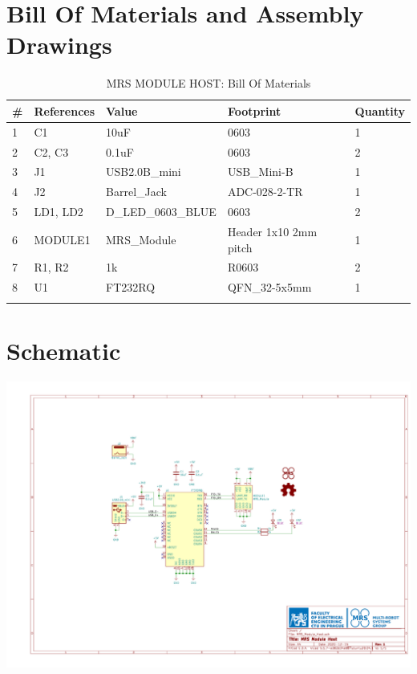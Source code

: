 \documentclass[12pt, a4paper]{article}
\begin{document}
\section{Bill Of Materials and Assembly Drawings}
\begin{longtable}{|p{0.5cm}|p{5cm}|p{5cm}|p{5cm}|p{1.7cm}|}
\hline
\textbf{\#} & \textbf{References}                                                          & \textbf{Value} & \textbf{Footprint} & \textbf{Quantity} 		\\ \hline
1 & C1       & 10uF               & 0603 & 1      				\\ \hline
2 & C2, C3   & 0.1uF              & 0603 & 2                	\\ \hline
3 & J1       & USB2.0B\_mini      & USB\_Mini-B   & 1       	\\ \hline
4 & J2       & Barrel\_Jack       & ADC-028-2-TR   & 1      	\\ \hline
5 & LD1, LD2 & D\_LED\_0603\_BLUE & 0603 & 2                	\\ \hline
6 & MODULE1  & MRS\_Module        & Header 1x10 2mm pitch & 1 	\\ \hline
7 & R1, R2   & 1k                 & R0603 & 2                  	\\ \hline
8 & U1       & FT232RQ            & QFN\_32-5x5mm & 1     	  	\\ \hline
\caption{MRS MODULE HOST: Bill Of Materials}
\label{tab:bom}
\end{longtable}
\vfill
\restoregeometry

\pagebreak



\pagebreak
\section{Schematic}
\includegraphics[scale=0.8, angle=270]{figures/Schematic.pdf}
\end{document}
